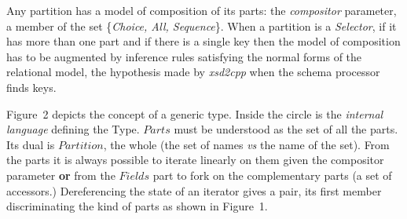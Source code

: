 Any partition has a model of composition of its parts: the {\it compositor} parameter, a member of the set \{\textit{Choice, All, Sequence}\}. When a partition is a \textit{Selector}, if it has more than one part and if there is a single key then the model of composition has to be augmented by inference rules satisfying the normal forms of the relational model, the hypothesis made by  {\it xsd2cpp} when the schema processor finds keys.

Figure~2 depicts the concept of a generic type. Inside the circle is the {\it internal language} defining the Type. $Parts$ must be understood as the set of all the parts. Its dual is  $Partition$, the whole (the set of names {\it vs} the name of the set). From the parts it is always possible to iterate linearly on them given the compositor parameter {\bf or} from the $Fields$ part to fork on the complementary parts (a set of accessors.) Dereferencing the state of an iterator gives a pair, its first member discriminating the kind of parts as shown in Figure~1.

